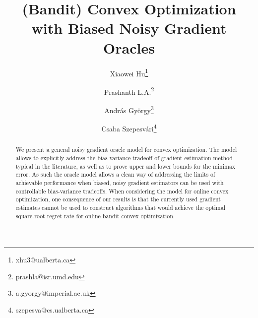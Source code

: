 \documentclass[11pt,letterpaper,english]{article}
\begin{document}
%

%


\title{(Bandit) Convex Optimization with Biased Noisy Gradient Oracles}
\author[1]{Xiaowei  Hu\thanks{xhu3@ualberta.ca}}
\author[2]{Prashanth L.A.\thanks{prashla@isr.umd.edu}}
\author[3]{Andr\'as Gy\"orgy\thanks{a.gyorgy@imperial.ac.uk}}
\author[4]{Csaba Szepesv\'ari\thanks{szepesva@cs.ualberta.ca}}


\renewcommand\Authands{ and }

\date{}

\maketitle

\begin{abstract}
We present a general noisy gradient oracle model for convex optimization. The model allows to explicitly address the bias-variance tradeoff of gradient estimation method typical in the literature, as well as to prove upper and lower bounds for the minimax error. As such the oracle model allows a clean way of addressing the limits of achievable performance
when biased, noisy gradient estimators can be used with controllable bias-variance tradeoffs.
When considering the model for online convex optimization,
one consequence of our results is that the currently used gradient estimates cannot be used to construct
algorithms that would achieve the optimal square-root regret rate for online bandit convex optimization.
\end{abstract}
\end{document}

